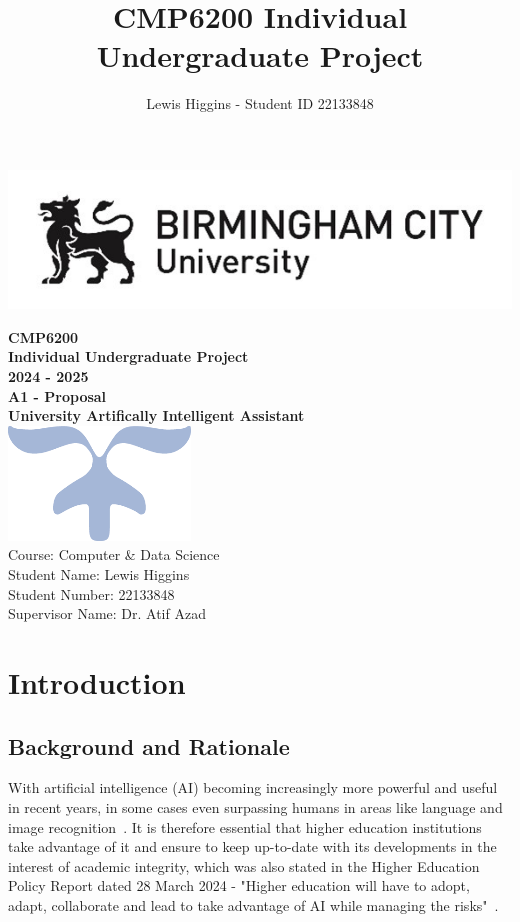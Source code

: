 \documentclass[12pt]{report}
\title{CMP6200 Individual Undergraduate Project}
\author{Lewis Higgins - Student ID 22133848}
\begin{document}
    \makeatletter
    \begin{titlepage}
        \includegraphics[width=0.3\linewidth]{BCUWide.jpg}\\[4ex]
        \vspace{1cm}
        \begin{center}
            {\huge \bfseries  CMP6200}\\[2ex]
            {\huge \bfseries  Individual Undergraduate Project}\\[2ex]
            {\huge \bfseries 2024 - 2025}\\[6ex]
            {\large \bfseries A1 - Proposal}\\[10ex]
            {\huge \bfseries University Artifically Intelligent Assistant}\\[6ex]
            \includegraphics[width=0.1\linewidth]{Symbol.png}\\[40ex]
            Course: Computer \& Data Science\\
            Student Name: Lewis Higgins\\
            Student Number: 22133848\\
            Supervisor Name: Dr. Atif Azad
        \end{center}
    \end{titlepage}
    \makeatother
    \thispagestyle{empty}
    \newpage

    \tableofcontents

    \chapter{Introduction}\label{ch:introduction}
    \section{Background and Rationale}
    With artificial intelligence (AI) becoming increasingly more powerful and useful in 
    recent years, in some cases even surpassing humans in areas like language and image 
    recognition~\autocite{owid-artificial-intelligence}. It is therefore essential that 
    higher education institutions take advantage of it and ensure to keep up-to-date with its
    developments in the interest of academic integrity, which was also stated in the 
    Higher Education Policy Report dated 28 March 2024 - "Higher education will have to adopt,
    adapt, collaborate and lead to take advantage of AI while managing the risks"~\autocite{AIUni}.\\
    
\end{document}
